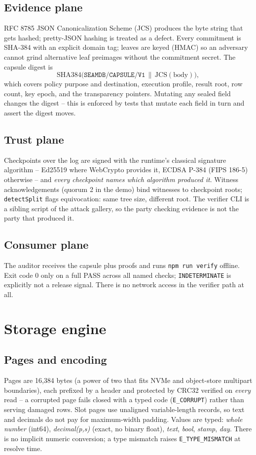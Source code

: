 \documentclass[11pt]{article}
\newcommand{\code}[1]{\texttt{#1}}
\begin{document}
\subsection{Evidence plane}
RFC 8785 JSON Canonicalization Scheme (JCS) produces the byte string that
gets hashed; pretty-JSON hashing is treated as a defect. Every commitment is
SHA-384 with an explicit domain tag; leaves are keyed (HMAC) so an adversary
cannot grind alternative leaf preimages without the commitment secret. The
capsule digest is
\[
  \mathrm{SHA384}\big(\texttt{SEAMDB/CAPSULE/V1}\,\|\,\mathrm{JCS}(\mathrm{body})\big),
\]
which covers policy purpose and destination, execution profile, result root,
row count, key epoch, and the transparency pointers. Mutating any sealed
field changes the digest -- this is enforced by tests that mutate each field
in turn and assert the digest moves.

\subsection{Trust plane}
Checkpoints over the log are signed with the runtime's classical signature
algorithm -- Ed25519 where WebCrypto provides it, ECDSA P-384 (FIPS 186-5)
otherwise -- and \emph{every checkpoint names which algorithm produced it}.
Witness acknowledgements (quorum 2 in the demo) bind witnesses to
checkpoint roots; \code{detectSplit} flags equivocation: same tree size,
different root. The verifier CLI is a sibling script of the attack gallery,
so the party checking evidence is not the party that produced it.

\subsection{Consumer plane}
The auditor receives the capsule plus proofs and runs \code{npm run verify}
offline. Exit code 0 only on a full PASS across all named checks;
\code{INDETERMINATE} is explicitly not a release signal. There is no network
access in the verifier path at all.

\section{Storage engine}
\label{sec:storage}

\subsection{Pages and encoding}
Pages are 16{,}384 bytes (a power of two that fits NVMe and object-store
multipart boundaries), each prefixed by a header and protected by CRC32
verified on \emph{every} read -- a corrupted page fails closed with a typed
code (\code{E\_CORRUPT}) rather than serving damaged rows. Slot pages use
unaligned variable-length records, so text and decimals do not pay for
maximum-width padding. Values are typed: \emph{whole number} (int64),
\emph{decimal(p,s)} (exact, no binary float), \emph{text}, \emph{bool},
\emph{stamp}, \emph{day}. There is no implicit numeric conversion; a type
mismatch raises \code{E\_TYPE\_MISMATCH} at resolve time.
\end{document}

